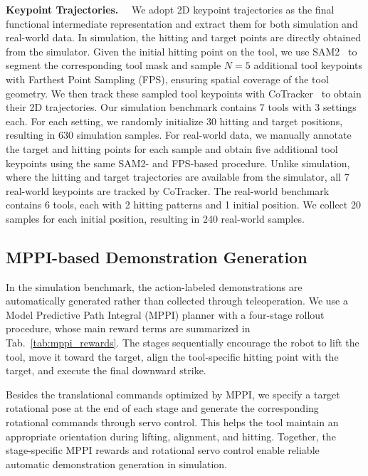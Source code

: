 \textbf{Keypoint Trajectories.}~~
We adopt 2D keypoint trajectories as the final functional intermediate representation and extract them for both simulation and real-world data. In simulation, the hitting and target points are directly obtained from the simulator. Given the initial hitting point on the tool, we use SAM2~\cite{ravi2025sam} to segment the corresponding tool mask and sample $N=5$ additional tool keypoints with Farthest Point Sampling (FPS), ensuring spatial coverage of the tool geometry. We then track these sampled tool keypoints with CoTracker~\cite{karaev2024cotracker} to obtain their 2D trajectories. Our simulation benchmark contains 7 tools with 3 settings each. For each setting, we randomly initialize 30 hitting and target positions, resulting in 630 simulation samples.
For real-world data, we manually annotate the target and hitting points for each sample and obtain five additional tool keypoints using the same SAM2- and FPS-based procedure. Unlike simulation, where the hitting and target trajectories are available from the simulator, all 7 real-world keypoints are tracked by CoTracker. The real-world benchmark contains 6 tools, each with 2 hitting patterns and 1 initial position. We collect 20 samples for each initial position, resulting in 240 real-world samples.



\subsection{MPPI-based Demonstration Generation}
\label{app:mppi_annotation}

In the simulation benchmark, the action-labeled demonstrations are automatically generated rather than collected through teleoperation. We use a Model Predictive Path Integral (MPPI) planner with a four-stage rollout procedure, whose main reward terms are summarized in Tab.~\ref{tab:mppi_rewards}. The stages sequentially encourage the robot to lift the tool, move it toward the target, align the tool-specific hitting point with the target, and execute the final downward strike.

Besides the translational commands optimized by MPPI, we specify a target rotational pose at the end of each stage and generate the corresponding rotational commands through servo control. This helps the tool maintain an appropriate orientation during lifting, alignment, and hitting. Together, the stage-specific MPPI rewards and rotational servo control enable reliable automatic demonstration generation in simulation.


